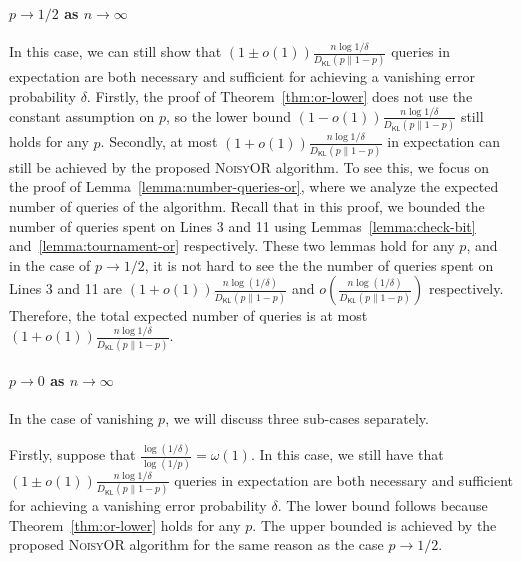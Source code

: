 \documentclass[journal, onecolumn]{IEEEtran}
\theoremstyle{plain}
\theoremstyle{definition}
\theoremstyle{remark}
\def\DKL{{D_\mathsf{KL}(p\|1-p)}}
\newcommand{\sno}{\textsc{NoisyOR }}
\begin{document}
\paragraph{$p\rightarrow 1/2$ as $n\rightarrow\infty$} In this case, we can still show that $(1\pm o(1))\frac{n\log{1/\delta}}{\DKL}$ queries in expectation are both necessary and sufficient for achieving a vanishing error probability $\delta$. Firstly, the proof of Theorem~\ref{thm:or-lower} does not use the constant assumption on $p$, so the lower bound $(1- o(1))\frac{n\log{1/\delta}}{\DKL}$ still holds for any $p$. Secondly, at most $(1+ o(1))\frac{n\log{1/\delta}}{\DKL}$ in expectation can still be achieved by the proposed \sno algorithm. To see this, we focus on the proof of Lemma~\ref{lemma:number-queries-or}, where we analyze the expected number of queries of the algorithm. Recall that in this proof, we bounded the number of queries spent on Lines 3 and 11 using Lemmas~\ref{lemma:check-bit} and~\ref{lemma:tournament-or} respectively. These two lemmas hold for any $p$, and in the case of $p\rightarrow 1/2$, it is not hard to see the the number of queries spent on Lines 3 and 11 are $(1+o(1))\frac{n\log(1/\delta)}{\DKL}$ and $o\left(\frac{n\log(1/\delta)}{\DKL}\right)$ respectively. Therefore, the total expected number of queries is at most $(1+ o(1))\frac{n\log{1/\delta}}{\DKL}$.

\paragraph{$p\rightarrow 0$ as $n\rightarrow\infty$} In the case of vanishing $p$, we will discuss three sub-cases separately. 

Firstly, suppose that $\frac{\log(1/\delta)}{\log(1/p)}=\omega(1)$. In this case, we still have that $(1\pm o(1))\frac{n\log{1/\delta}}{\DKL}$ queries in expectation are both necessary and sufficient for achieving a vanishing error probability $\delta$. The lower bound follows because Theorem~\ref{thm:or-lower} holds for any $p$. The upper bounded is achieved by the proposed  \sno algorithm for the same reason as the case $p\rightarrow 1/2$.
\end{document}
